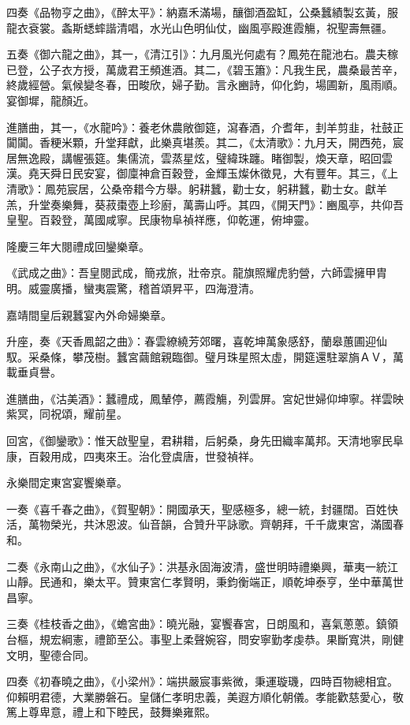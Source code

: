 四奏《品物亨之曲》，《醉太平》：納嘉禾滿場，釀御酒盈缸，公桑蠶績製玄黃，服龍衣袞裳。螽斯蟋蟀諧清唱，水光山色明仙仗，幽風亭殿進霞觴，祝聖壽無疆。

五奏《御六龍之曲》，其一，《清江引》：九月風光何處有？鳳苑在龍池右。農夫稼已登，公子衣方授，萬歲君王頻進酒。其二，《碧玉簫》：凡我生民，農桑最苦辛，終歲經營。氣候變冬春，田畯欣，婦子勤。言永豳詩，仰化鈞，場圃新，風雨順。宴御墀，龍顏近。

進膳曲，其一，《水龍吟》：養老休農敞御筵，瀉春酒，介耆年，刲羊剪韭，社鼓正闐闐。香粳米顆，升堂拜獻，此樂真堪羨。其二，《太清歌》：九月天，開西苑，宸居無逸殿，講幄張筵。集儒流，雲蒸星炫，璧緯珠躔。睹御製，煥天章，昭回雲漢。堯天舜日民安宴，御廩神倉百穀登，金輝玉燦休徵見，大有豐年。其三，《上清歌》：鳳苑宸居，公桑帝耤今方舉。躬耕蠶，勸士女，躬耕蠶，勸士女。獻羊羔，升堂奏樂舞，葵菽棗壺上珍廚，萬壽山呼。其四，《開天門》：豳風亭，共仰吾皇聖。百穀登，萬國咸寧。民康物阜禎祥應，仰乾運，俯坤靈。

隆慶三年大閱禮成回鑾樂章。

《武成之曲》：吾皇閱武成，簡戎旅，壯帝京。龍旗照耀虎豹營，六師雲擁甲胄明。威靈廣播，蠻夷震驚，稽首頌昇平，四海澄清。

嘉靖間皇后親蠶宴內外命婦樂章。

升座，奏《天香鳳韶之曲》：春雲繚繞芳郊曙，喜乾坤萬象感舒，蘭皋蕙圃迎仙馭。采桑條，攀茂樹。蠶宮繭館親臨御。璧月珠星照太虛，開筵還駐翠旓ＡＶ，萬載垂貞譽。

進膳曲，《沽美酒》：蠶禮成，鳳輦停，薦霞觴，列雲屏。宮妃世婦仰坤寧。祥雲映紫冥，同祝頌，耀前星。

回宮，《御鑾歌》：惟天啟聖皇，君耕耤，后躬桑，身先田織率萬邦。天清地寧民阜康，百穀用成，四夷來王。治化登虞唐，世發禎祥。

永樂間定東宮宴饗樂章。

一奏《喜千春之曲》，《賀聖朝》：開國承天，聖感極多，總一統，封疆闊。百姓快活，萬物榮光，共沐恩波。仙音韻，合贊升平詠歌。齊朝拜，千千歲東宮，滿國春和。

二奏《永南山之曲》，《水仙子》：洪基永固海波清，盛世明時禮樂興，華夷一統江山靜。民通和，樂太平。贊東宮仁孝賢明，秉鈞衡端正，順乾坤泰亨，坐中華萬世昌寧。

三奏《桂枝香之曲》，《蟾宮曲》：曉光融，宴饗春宮，日朗風和，喜氣蔥蔥。鎮領台樞，規宏綱憲，禮節至公。事聖上柔聲婉容，問安寧勤孝虔恭。果斷寬洪，剛健文明，聖德合同。

四奏《初春曉之曲》，《小梁州》：端拱嚴宸事紫微，秉運璇璣，四時百物總相宜。仰賴明君德，大業勝磐石。皇儲仁孝明忠義，美遐方順化朝儀。孝能歡慈愛心，敬篤上尊卑意，禮上和下睦民，鼓舞樂雍熙。

